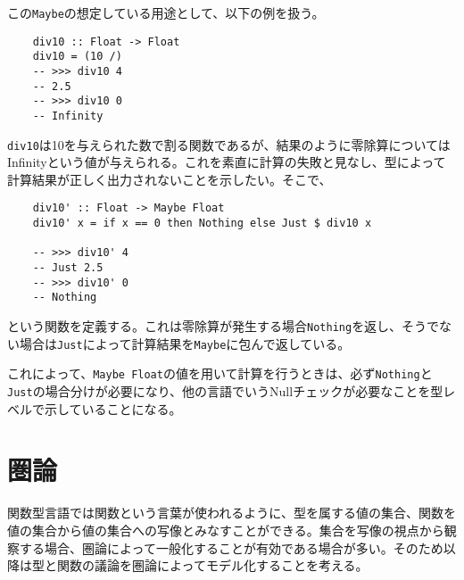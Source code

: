 \documentclass[uplatex,dvipdfmx]{jsarticle}
\newcommand{\pr}[1]{\colorbox[rgb]{0.9,0.9,0.9}{\lstinline{#1}}}
\begin{document}
  この\pr{Maybe}の想定している用途として、以下の例を扱う。
  \begin{lstlisting}
    div10 :: Float -> Float
    div10 = (10 /)
    -- >>> div10 4
    -- 2.5
    -- >>> div10 0
    -- Infinity
  \end{lstlisting}
  \pr{div10}は10を与えられた数で割る関数であるが、結果のように零除算についてはInfinityという値が与えられる。これを素直に計算の失敗と見なし、型によって計算結果が正しく出力されないことを示したい。そこで、
  \begin{lstlisting}
    div10' :: Float -> Maybe Float
    div10' x = if x == 0 then Nothing else Just $ div10 x

    -- >>> div10' 4
    -- Just 2.5
    -- >>> div10' 0
    -- Nothing
  \end{lstlisting}
  という関数を定義する。これは零除算が発生する場合\pr{Nothing}を返し、そうでない場合は\pr{Just}によって計算結果を\pr{Maybe}に包んで返している。

  これによって、\pr{Maybe Float}の値を用いて計算を行うときは、必ず\pr{Nothing}と\pr{Just}の場合分けが必要になり、他の言語でいうNullチェックが必要なことを型レベルで示していることになる。
  \section{圏論}
  関数型言語では関数という言葉が使われるように、型を属する値の集合、関数を値の集合から値の集合への写像とみなすことができる。集合を写像の視点から観察する場合、圏論によって一般化することが有効である場合が多い。そのため以降は型と関数の議論を圏論によってモデル化することを考える。
\end{document}
